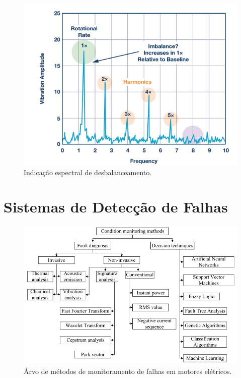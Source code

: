 \begin{figure}[H]
    \caption{Indicação espectral de desbalanceamento.}
    \begin{center}
        \includegraphics[scale=.5]{referencial/img/imbalance_analog_p2.png}
    \end{center}
    \label{fig:}
\end{figure}


% 

\section{Sistemas de Detecção de Falhas}\label{sec:}

\begin{figure}[H]
    \caption{Árvo de métodos de monitoramento de falhas em motores elétricos.}
    \begin{center}
        \includegraphics[scale=.5]{referencial/img/monitoring_methods_rilski_p78.png}
    \end{center}
    \label{fig:}
\end{figure}


